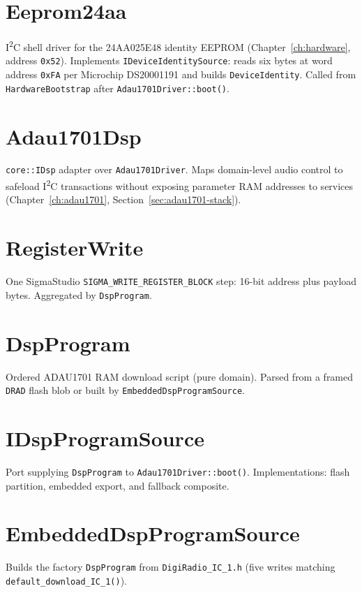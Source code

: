 \section{Eeprom24aa}\label{cls:Eeprom24aa}
I\textsuperscript{2}C shell driver for the 24AA025E48 identity EEPROM
(Chapter~\ref{ch:hardware}, address \texttt{0x52}). Implements
\texttt{IDeviceIdentitySource}: reads six bytes at word address \texttt{0xFA}
per Microchip DS20001191 and builds \texttt{DeviceIdentity}. Called from
\texttt{HardwareBootstrap} after \texttt{Adau1701Driver::boot()}.

\section{Adau1701Dsp}\label{cls:Adau1701Dsp}
\texttt{core::IDsp} adapter over \texttt{Adau1701Driver}. Maps domain-level
audio control to safeload I\textsuperscript{2}C transactions without exposing
parameter RAM addresses to services (Chapter~\ref{ch:adau1701},
Section~\ref{sec:adau1701-stack}).

\section{RegisterWrite}\label{cls:RegisterWrite}
One SigmaStudio \texttt{SIGMA\_WRITE\_REGISTER\_BLOCK} step: 16-bit address
plus payload bytes. Aggregated by \texttt{DspProgram}.

\section{DspProgram}\label{cls:DspProgram}
Ordered ADAU1701 RAM download script (pure domain). Parsed from a framed
\texttt{DRAD} flash blob or built by \texttt{EmbeddedDspProgramSource}.

\section{IDspProgramSource}\label{cls:IDspProgramSource}
Port supplying \texttt{DspProgram} to \texttt{Adau1701Driver::boot()}.
Implementations: flash partition, embedded export, and fallback composite.

\section{EmbeddedDspProgramSource}\label{cls:EmbeddedDspProgramSource}
Builds the factory \texttt{DspProgram} from \texttt{DigiRadio\_IC\_1.h}
(five writes matching \texttt{default\_download\_IC\_1()}).

